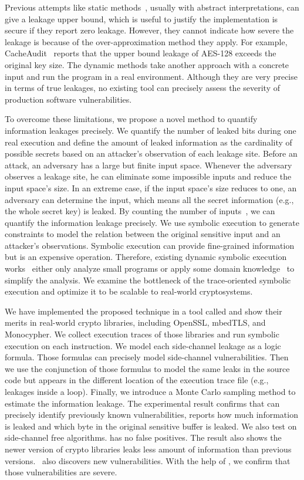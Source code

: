 Previous attempts like static methods~\cite{182946,5207642}, usually with
abstract interpretations, can give a leakage upper bound, which is useful to
justify the implementation is secure if they report zero leakage.
However, they cannot indicate how severe the leakage is because of the
over-approximation method they apply. For example, CacheAudit~\cite{182946} 
reports that the upper bound leakage of AES-128 exceeds the original key size. The dynamic methods take
another approach with a concrete input and run the program in a real
environment. Although they are very precise in terms of true leakages, no
existing tool can precisely assess the severity of production
software vulnerabilities. 

To overcome these limitations, we propose a novel method to quantify information 
leakages precisely. We quantify the number of leaked bits during one real 
execution and define the amount of leaked information as the cardinality of 
possible secrets based on an attacker's observation of each leakage 
site. Before an attack, an adversary has a large but finite input space. 
Whenever the adversary observes a leakage site, he can eliminate some impossible 
inputs and reduce the input space's size. In an extreme case, if the input space's size 
reduces to one, an adversary can determine the input, 
which means all the secret information (e.g., the whole secret key) is
leaked. By counting the number of inputs~\cite{10.1007/11499107_24}, 
we can quantify the information leakage precisely.
We use symbolic execution to generate constraints to model the relation 
between the original sensitive input and an attacker's observations. 
Symbolic execution can provide fine-grained information but is an expensive
operation. Therefore, existing dynamic symbolic
execution works~\cite{203878,236338,Brotzman19Casym} either only analyze
small programs or apply some domain knowledge~\cite{203878} to simplify the analysis. We
examine the bottleneck of the trace-oriented symbolic execution and optimize it
to be scalable to real-world cryptosystems.

We have implemented the proposed technique in a tool called \tool{} and show 
their merits in real-world crypto libraries, including OpenSSL, 
mbedTLS, and Monocypher.
We collect execution traces of those libraries and run 
symbolic execution on each instruction. We model
each side-channel leakage as a logic formula. Those
formulas can precisely model side-channel vulnerabilities. 
Then we use the conjunction of those formulas to model the 
same leaks in the source code but appears in the different location of
the execution trace file (e.g., leakages inside a loop).
Finally, we introduce a Monte Carlo sampling method to estimate 
the information leakage. 
The experimental result confirms
that \tool{} can precisely identify previously known vulnerabilities, 
reports how much information is leaked and which byte in the original sensitive 
buffer is leaked. We also test \tool{} on side-channel free algorithms. 
\tool{} has no false positives.
The result also shows the newer version of crypto libraries leaks less amount of information 
than previous versions.
\tool\ also discovers new vulnerabilities. With the help of \tool{}, 
we confirm that those vulnerabilities are severe.



